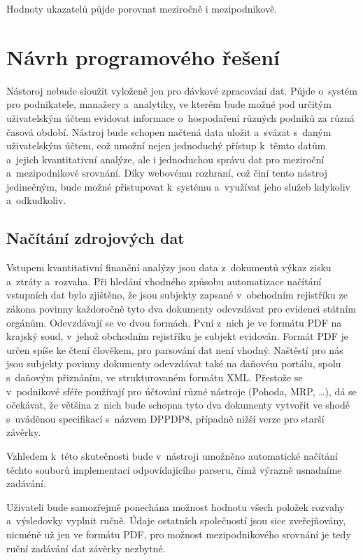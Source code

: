 Hodnoty ukazatelů půjde porovnat meziročně i mezipodnikově.

\section{Návrh programového řešení}

Nástoroj nebude sloužit vyloženě jen pro dávkové zpracování dat. Půjde o~systém pro podnikatele, manažery a~analytiky, ve kterém bude možné pod určitým uživatelským účtem evidovat informace o~hospodaření různých podniků za různá časová období. Nástroj bude schopen načtená data uložit a~svázat s~daným uživatelským účtem, což umožní nejen jednoduchý přístup k~těmto datům a~jejich kvantitativní analýze, ale i jednoduchou správu dat pro meziroční a~mezipodnikové srovnání. Díky webovému rozhraní, což činí tento nástroj jedinečným, bude možné přistupovat k~systému a~využívat jeho služeb kdykoliv a~odkudkoliv.

\subsection{Načítání zdrojových dat}
Vstupem kvantitativní finanční analýzy jsou data z~dokumentů výkaz zisku a~ztráty a~rozvaha. Při hledání vhodného způsobu automatizace načítání vstupních dat bylo zjištěno, že jsou subjekty zapsané v~obchodním rejistříku ze zákona povinny každoročně tyto dva dokumenty odevzdávat pro evidenci státním orgánům. 
Odevzdávají se ve dvou formách. Pvní z~nich je ve formátu PDF na krajský soud, v~jehož obchodním rejistříku je subjekt evidován. Formát PDF je určen spíše ke čtení člověkem, pro parsování dat není vhodný. Naštěstí pro nás jsou subjekty povinny dokumenty odevzdávat také na daňovém portálu, spolu s~daňovým přiznáním, ve strukturovaném formátu XML. Přestože se v~podnikové sféře používají pro účtování různé nástroje (Pohoda, MRP, \dots), dá se očekávat, že většina z~nich bude schopna tyto dva dokumenty vytvořit ve shodě s~uváděnou specifikací s~názvem DPPDP8, případně nižší verze pro starší závěrky.

Vzhledem k~této skutečnosti bude v~nástroji umožněno automatické načítání těchto souborů implementací odpovídajícího parseru, čímž výrazně usnadníme zadávání.

Uživateli bude samozřejmě ponechána možnost hodnotu všech položek rozvahy a~výsledovky vyplnit ručně. Údaje ostatních společností jsou sice zveřejňovány, nicméně už jen ve formátu PDF, pro možnost mezipodnikového srovnání je tedy ruční zadávání dat závěrky nezbytné.






